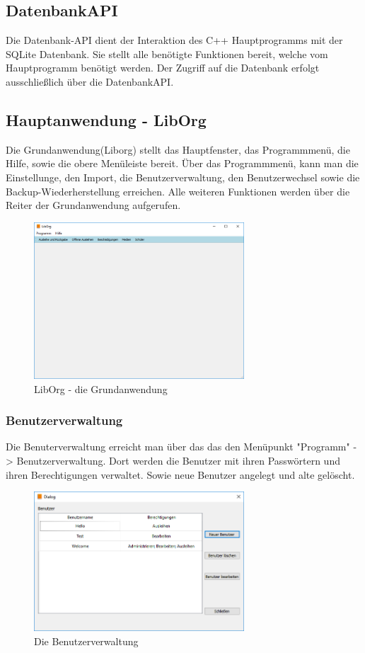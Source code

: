 \subsection{Datenbank\-API}
Die Datenbank-API dient der Interaktion des C++ Hauptprogramms mit der SQLite Datenbank. Sie stellt alle benötigte Funktionen bereit, welche vom Hauptprogramm benötigt werden. Der Zugriff auf die Datenbank erfolgt ausschließlich über die Datenbank\-API.


\subsection{Hauptanwendung - LibOrg}
Die Grundanwendung(Liborg) stellt das Hauptfenster, das Programmmenü, die  Hilfe, sowie die obere Menüleiste bereit. Über das Programmmenü, kann man die Einstellunge, den Import, die Benutzerverwaltung, den Benutzerwechsel sowie die Backup-Wiederherstellung erreichen. Alle weiteren Funktionen werden über die Reiter der Grundanwendung aufgerufen. 
\begin{figure}[H]
	\centering
		\includegraphics[width=0.70\textwidth]{figures/Liborg.png}
	\caption{LibOrg - die Grundanwendung}
	\label{fig:Mainwindow}
\end{figure}


\subsubsection{Benutzerverwaltung}
Die Benuterverwaltung erreicht man über das das den Menüpunkt "Programm" -> Benutzerverwaltung. Dort werden die Benutzer mit ihren Passwörtern und ihren Berechtigungen verwaltet. Sowie neue Benutzer angelegt und alte gelöscht.
\begin{figure}[H]
	\centering
		\includegraphics[width=0.70\textwidth]{figures/usermanagement.png}
	\caption{Die Benutzerverwaltung}
	\label{fig:usermanagement}
\end{figure}


